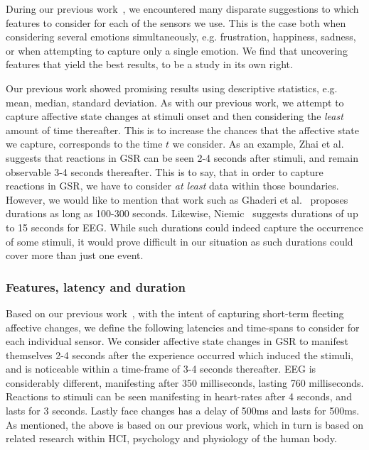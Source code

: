 During our previous work~\cite{9th_semester_project}, we encountered many disparate suggestions to which features to
consider for each of the sensors we use. This is the case both when considering several emotions simultaneously,
e.g. frustration, happiness, sadness, or when attempting to capture only a single emotion. We find that uncovering
features that yield the best results, to be a study in its own right.

Our previous work showed promising results using descriptive statistics, e.g. mean, median, standard deviation. As with
our previous work, we attempt to capture affective state changes at stimuli onset and then considering the
\textit{least} amount of time thereafter. This is to increase the chances that the affective state we capture,
corresponds to the time $t$ we consider. As an example, Zhai et
al.~\cite{gsr_len_lat3} suggests that reactions in GSR can be seen 2-4 seconds after stimuli, and remain observable 3-4
seconds thereafter. This is to say, that in order to capture reactions in GSR, we have to consider \textit{at least}
data within those boundaries. However, we would like to mention that work such as Ghaderi et
al.~\cite{machine_learning_100s_gsr} proposes durations as long as 100-300 seconds. Likewise,
Niemic~\cite{studies_of_emotion} suggests durations of up to 15 seconds for EEG. While such durations could indeed
capture the occurrence of some stimuli, it would prove difficult in our situation as such durations could cover more
than just one event.

\subsubsection{Features, latency and duration}
Based on our previous work~\cite{9th_semester_project, first_paper}, with the intent of capturing short-term fleeting affective changes, we define the following
latencies and time-spans to consider for each individual sensor.
We consider affective state changes in GSR to manifest themselves 2-4 seconds after the experience occurred which
induced the stimuli, and is noticeable within a time-frame of 3-4 seconds thereafter. EEG is considerably different,
manifesting after 350 milliseconds, lasting 760 milliseconds. Reactions to stimuli can be seen manifesting in heart-rates
after 4 seconds, and lasts for 3 seconds. Lastly face changes has a delay of 500ms and lasts for 500ms. As mentioned,
the above is based on our previous work, which in turn is based on related research within HCI, psychology and
physiology of the human body.

